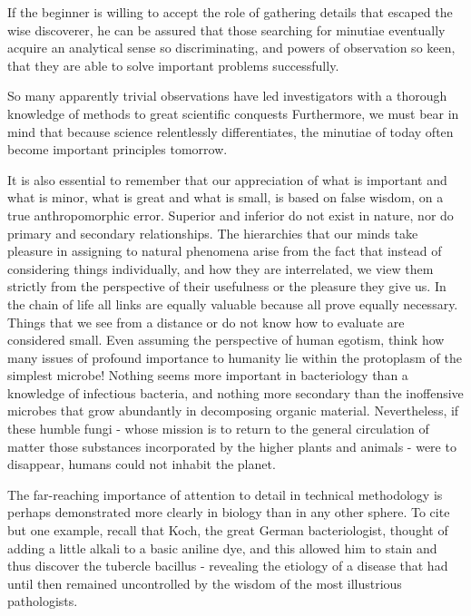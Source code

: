 \documentclass{article}
\begin{document}
If the beginner is willing to accept the role of gathering details that escaped the wise discoverer, he can be assured that those searching for minutiae eventually acquire an analytical sense so discriminating, and powers of observation so keen, that they are able to solve important problems successfully.

So many apparently trivial observations have led investigators with a thorough knowledge of methods to great scientific conquests\! Furthermore, we must bear in mind that because science relentlessly differentiates, the minutiae of today often become important principles tomorrow.

It is also essential to remember that our appreciation of what is important and what is minor, what is great and what is small, is based on false wisdom, on a true anthropomorphic error. Superior and inferior do not exist in nature, nor do primary and secondary relationships. The hierarchies that our minds take pleasure in assigning to natural phenomena arise from the fact that instead of considering things individually, and how they are interrelated, we view them strictly from the perspective of their usefulness or the pleasure they give us. In the chain of life all links are equally valuable because all prove equally necessary. Things that we see from a distance or do not know how to evaluate are considered small. Even assuming the perspective of human egotism, think how many issues of profound importance to humanity lie within the protoplasm of the simplest microbe! Nothing seems more important in bacteriology than a knowledge of infectious bacteria, and nothing more secondary than the inoffensive microbes that grow abundantly in decomposing organic material. Nevertheless, if these humble fungi - whose mission is to return to the general circulation of matter those substances incorporated by the higher plants and animals - were to disappear, humans could not inhabit the planet.

The far-reaching importance of attention to detail in technical methodology is perhaps demonstrated more clearly in biology than in any other sphere. To cite but one example, recall that Koch, the great German bacteriologist, thought of adding a little alkali to a basic aniline dye, and this allowed him to stain and thus discover the tubercle bacillus - revealing the etiology of a disease that had until then remained uncontrolled by the wisdom of the most illustrious pathologists.
\end{document}

